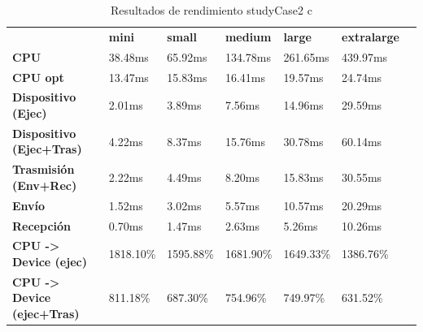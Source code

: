 \begin{table}[H]
    \centering
    \begin{tabular}{lllllll}
    \rowcolor[HTML]{DAE8FC} \ &  \textbf{mini} &  \textbf{small} &  \textbf{medium} &  \textbf{	large} &  \textbf{	extralarge} \\
    \cellcolor[HTML]{DAE8FC} \textbf{CPU} & 38.48ms & 65.92ms & 134.78ms & 	261.65ms & 	439.97ms \\
    \rowcolor[HTML]{EFEFEF} \cellcolor[HTML]{DAE8FC} \textbf{CPU opt} & 13.47ms & 15.83ms & 16.41ms & 	19.57ms & 	24.74ms \\
    \cellcolor[HTML]{DAE8FC} \textbf{Dispositivo (Ejec)} & 2.01ms & 3.89ms & 7.56ms & 	14.96ms & 	29.59ms \\
    \rowcolor[HTML]{EFEFEF} \cellcolor[HTML]{DAE8FC} \textbf{Dispositivo (Ejec+Tras)} & 4.22ms & 8.37ms & 15.76ms & 	30.78ms & 	60.14ms \\
    \cellcolor[HTML]{DAE8FC} \textbf{Trasmisión (Env+Rec)} & 2.22ms & 4.49ms & 8.20ms & 	15.83ms & 	30.55ms \\
    \rowcolor[HTML]{EFEFEF} \cellcolor[HTML]{DAE8FC} \textbf{Envío} & 1.52ms & 3.02ms & 5.57ms & 	10.57ms & 	20.29ms \\
    \cellcolor[HTML]{DAE8FC} \textbf{Recepción} & 0.70ms & 1.47ms & 2.63ms & 	5.26ms & 	10.26ms \\
    \rowcolor[HTML]{EFEFEF} \cellcolor[HTML]{DAE8FC} \textbf{CPU -> Device (ejec)} & 1818.10\% & 1595.88\% & 1681.90\% & 	1649.33\% & 	1386.76\% \\
    \cellcolor[HTML]{DAE8FC} \textbf{CPU -> Device (ejec+Tras)} & 811.18\% & 687.30\% & 754.96\% & 	749.97\% & 	631.52\% \\
    \end{tabular}
    \caption[Resultados de rendimiento studyCase2 c]{{Resultados de rendimiento studyCase2 c}}
    \label{table_test_studyCase2_c_hw_performanceResults}
\end{table}